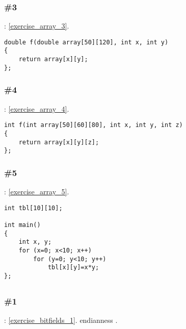 \subsubsection{\Exercise \#3}
\label{exercise_solutions_arrays_3}

\Exercise: \ref{exercise_array_3}.

\begin{lstlisting}
double f(double array[50][120], int x, int y)
{
	return array[x][y];
};
\end{lstlisting}

\subsubsection{\Exercise \#4}
\label{exercise_solutions_arrays_4}

\Exercise: \ref{exercise_array_4}.

\begin{lstlisting}
int f(int array[50][60][80], int x, int y, int z)
{
	return array[x][y][z];
};
\end{lstlisting}

\subsubsection{\Exercise \#5}
\label{exercise_solutions_arrays_5}

\Exercise: \ref{exercise_array_5}.


\begin{lstlisting}
int tbl[10][10];

int main()
{
	int x, y;
	for (x=0; x<10; x++)
		for (y=0; y<10; y++)
			tbl[x][y]=x*y;
};
\end{lstlisting}


\subsection{}

\subsubsection{\Exercise \#1}
\label{exercise_solutions_bitfields_1}

\Exercise: \ref{exercise_bitfields_1}.
 \gls{endianness} 
.

